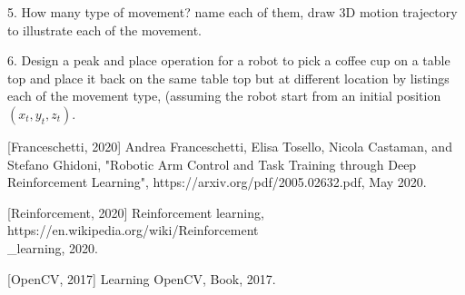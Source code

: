 \documentclass[conference]{IEEEtran}
\begin{document}
5. How many type of movement? name each of them, draw 3D motion trajectory 
to illustrate each of the movement. 

6. Design a peak and place operation for a robot to pick a coffee cup on
a table top and place it back on the same table top but at different 
location by listings each of the movement type, (assuming the robot start
from an initial position $(x_t,y_t,z_t)$. 
 
\begin{thebibliography}{1} 
[Franceschetti, 2020] 
Andrea Franceschetti, Elisa Tosello, Nicola Castaman, and Stefano
Ghidoni, 
"Robotic Arm Control and Task Training
through Deep Reinforcement Learning", 
https://arxiv.org/pdf/2005.02632.pdf, May 2020. 

[Reinforcement, 2020] 
Reinforcement learning, 
https://en.wikipedia.org/wiki/Reinforcement \\ \_learning, 2020. 

[OpenCV, 2017] 
Learning OpenCV, Book, 2017. 

\end{thebibliography}
 

\end{document}
